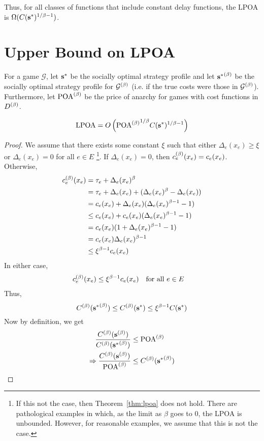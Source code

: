 \documentclass[twoside]{article}
\begin{document}
\begin{multicols}{2}
Thus, for all classes of functions that include constant delay functions, the
LPOA is $\Omega(C(\mathbf{s}^*)^{1/\beta-1})$.

\section{Upper Bound on LPOA} \label{sec:ub}
For a game $\mathcal{G}$, let $\mathbf{s}^*$ be the socially optimal strategy profile
and let ${\mathbf{s}^*}^{(\beta)}$ be the socially optimal strategy profile for
$\mathcal{G}^{(\beta)}$ (i.e. if the true costs were those in $\mathcal{G}^{(\beta)}$).
Furthermore, let $\text{POA}^{(\beta)}$ be the price of anarchy for games with cost functions in
$D^{(\beta)}$.
\begin{thm} \label{thm:lpoa}
  \[
    \text{LPOA} = O\left({\text{POA}^{(\beta)}}^{1/\beta} C(\mathbf{s}^*)^{1/\beta-1}\right)
  \]
\end{thm}
\begin{proof}
  We assume that there exists some constant $\xi$ such that either
  $\Delta_e(x_e) \ge \xi$ or $\Delta_e(x_e) = 0$ for all $e \in E$
  \footnote{If this not the case, then Theorem~\ref{thm:lpoa} does not hold.
  There are pathological examples in which, as the limit as $\beta$ goes to 0,
  the LPOA is unbounded. However, for reasonable examples, we assume that this
  is not the case.}. If $\Delta_e(x_e) = 0$, then $c_e^{(\beta)}(x_e) = c_e(x_e)$.
  Otherwise,
  \begin{align*}
    c_e^{(\beta)}(x_e) &= \tau_e + \Delta_e(x_e)^\beta \\
    &= \tau_e + \Delta_e(x_e) + (\Delta_e(x_e)^\beta - \Delta_e(x_e)) \\
    &= c_e(x_e) + \Delta_e(x_e)(\Delta_e(x_e)^{\beta-1} - 1) \\
    &\le c_e(x_e) + c_e(x_e)(\Delta_e(x_e)^{\beta-1} - 1) \\
    &= c_e(x_e) (1 + \Delta_e(x_e)^{\beta-1}-1) \\
    &= c_e(x_e) \Delta_e(x_e)^{\beta-1} \\
    &\le \xi^{\beta-1} c_e(x_e)
  \end{align*}
  In either case,
  \begin{align*}
    c_e^{(\beta)}(x_e) &\le \xi^{\beta-1} c_e(x_e) \quad \text{for all }e \in E
  \end{align*}
  Thus,
  \[
    C^{(\beta)}({\mathbf{s}^*}^{(\beta)}) \le C^{(\beta)}(\mathbf{s}^*) \le \xi^{\beta-1} C(\mathbf{s}^*)
  \]
  Now by definition, we get 
  \begin{align*}
  \frac{C\pbet(\s\pbet)}{C\pbet({\s^*}\pbet)} &\le \poab \\
  \Rightarrow \frac{C\pbet(\s\pbet)}{\poab} &\le C\pbet({\s^*}\pbet) \\

\end{align*}
\end{proof}
\end{multicols}
\end{document}
